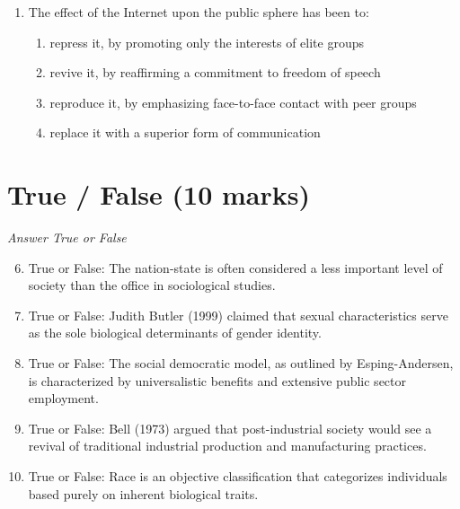 \documentclass[12pt]{article}
\begin{document}
\begin{enumerate}[label=\arabic*.]
\begin{enumerate}[label=(\alph*)]
    \item private, public and comprehensive schools
    \item grammar, technical, and secondary modern schools
    \item polytechnics, colleges and universities
\end{enumerate}
\item The effect of the Internet upon the public sphere has been to:
\begin{enumerate}[label=(\alph*)]
    \item repress it, by promoting only the interests of elite groups
    \item revive it, by reaffirming a commitment to freedom of speech
    \item reproduce it, by emphasizing face-to-face contact with peer groups
    \item replace it with a superior form of communication
\end{enumerate}
\end{enumerate}

\section*{True / False (10 marks)}
\textit{Answer True or False}
\begin{enumerate}[label=\arabic*.]
\setcounter{enumi}{5}
\item True or False: The nation-state is often considered a less important level of society than the office in sociological studies.
\item True or False: Judith Butler (1999) claimed that sexual characteristics serve as the sole biological determinants of gender identity.
\item True or False: The social democratic model, as outlined by Esping-Andersen, is characterized by universalistic benefits and extensive public sector employment.
\item True or False: Bell (1973) argued that post-industrial society would see a revival of traditional industrial production and manufacturing practices.
\item True or False: Race is an objective classification that categorizes individuals based purely on inherent biological traits.
\end{enumerate}
\end{document}
